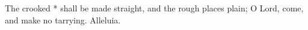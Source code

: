 The crooked * shall be made straight, and the rough places plain; O Lord, come, and make no tarrying. Alleluia.